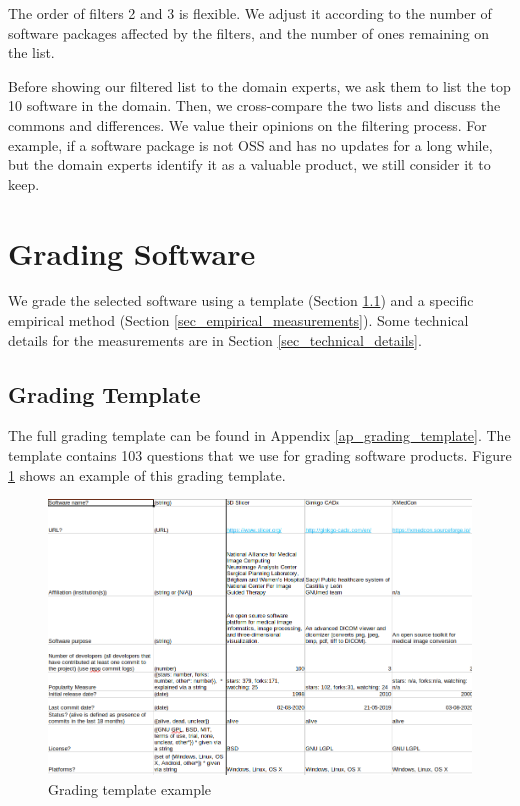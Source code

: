 The order of filters 2 and 3 is flexible. We adjust it according to the number of software packages affected by the filters, and the number of ones remaining on the list.

Before showing our filtered list to the domain experts, we ask them to list the top 10 software in the domain. Then, we cross-compare the two lists and discuss the commons and differences. We value their opinions on the filtering process. For example, if a software package is not OSS and has no updates for a long while, but the domain experts identify it as a valuable product, we still consider it to keep.

\section{Grading Software}
\label{sec_grading_software}

We grade the selected software using a template (Section \ref{sec_grading_template}) and a specific empirical method (Section \ref{sec_empirical_measurements}). Some technical details for the measurements are in Section \ref{sec_technical_details}.

\subsection{Grading Template}
\label{sec_grading_template}
The full grading template can be found in Appendix \ref{ap_grading_template}. The template contains 103 questions that we use for grading software products. Figure \ref{fg_grading_template_example} shows an example of this grading template.

\begin{figure}[h]
\includegraphics[scale=0.42]{figures/template.png}
\caption{Grading template example}
\label{fg_grading_template_example}
\end{figure}

